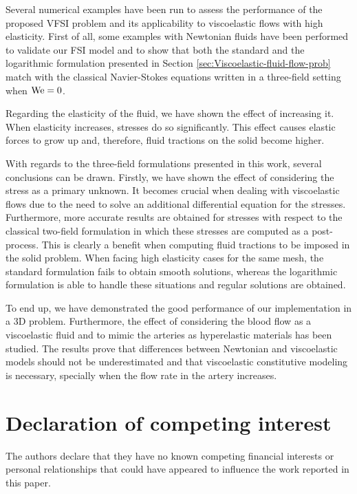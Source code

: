 \documentclass[11pt,english]{article}
\begin{document}
Several numerical examples have been run to assess the performance of the proposed VFSI problem and its applicability to viscoelastic flows with high elasticity. First of all, some examples with Newtonian fluids have been performed to validate our FSI model and to show that both the standard and the logarithmic formulation presented in Section \ref{sec:Viscoelastic-fluid-flow-prob} match with the classical Navier-Stokes equations written in a three-field setting when ${\rm We}=0$.

Regarding the elasticity of the fluid, we have shown the effect of increasing it. When elasticity increases, stresses do so significantly. This effect causes elastic forces to grow up and, therefore, fluid tractions on the solid become higher. 

With regards to the three-field formulations presented in this work, several conclusions can be drawn. Firstly, we have shown the effect of considering the stress as a primary unknown. It becomes crucial when dealing with viscoelastic flows due to the need to solve an additional differential equation for the stresses. Furthermore, more accurate results are obtained for stresses with respect to the classical two-field formulation in which these stresses are computed as a post-process. This is clearly a benefit when computing fluid tractions to be imposed in the solid problem. When facing high elasticity cases for the same mesh, the standard formulation fails to obtain smooth solutions, whereas the logarithmic formulation is able to handle these situations and regular solutions are obtained.

To end up, we have demonstrated the good performance of our implementation in a 3D problem. Furthermore, the effect of considering the blood flow as a viscoelastic fluid and to mimic the arteries as hyperelastic materials has been studied. The results prove that differences between Newtonian and viscoelastic models should not be underestimated and that viscoelastic constitutive modeling is necessary, specially when the flow rate in the artery increases.

\section*{Declaration of competing interest}

The authors declare that they have no known competing financial interests or personal relationships that could have appeared to influence the work reported in this paper.
\end{document}
